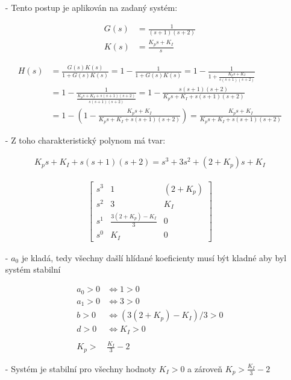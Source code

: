 \documentclass{article}
\newcommand\mat[1]{\begin{bmatrix}#1\end{bmatrix}}
\begin{document}
\begin{itemize}
    \item[-] Tento postup je aplikován na zadaný systém:

    \begin{align*}
        G(s) &= \frac{1}{(s+1)(s+2)}\\
        K(s) &= \frac{K_ps+K_I}{s}
    \end{align*}
    

    \begin{align*}
        H(s) &= \frac{G(s)K(s)}{1+G(s)K(s)} = 1-\frac{1}{1+G(s)K(s)}=
        1-\frac{1}{1+\frac{K_ps+K_I}{s(s+1)(s+2)}}\\
        &= 1-\frac{1}{\frac{K_ps+K_I+s(s+1)(s+2)}{s(s+1)(s+2)}}=
        1-\frac{s(s+1)(s+2)}{K_ps+K_I+s(s+1)(s+2)}\\
        &= 1-(1-\frac{K_ps+K_I}{K_ps+K_I+s(s+1)(s+2)})=\frac{K_ps+K_I}{K_ps+K_I+s(s+1)(s+2)}
    \end{align*}

    
    \item[-] Z toho charakteristický polynom má tvar:

    \begin{align*}
        K_ps+K_I+s(s+1)(s+2) = s^3+3s^2+(2+K_p)s+K_I
    \end{align*}

    \begin{align*}
        \mat{s^3 & 1 & (2+K_p)\\ 
             s^2 & 3 & K_I\\
             s^1 & \frac{3(2+K_p)-K_I}{3} & 0\\
             s^0 & K_I & 0}
    \end{align*}

    \item[-] $a_0$ je kladá, tedy všechny dašlí hlídané koeficienty musí být kladné aby byl systém stabilní
    
    \begin{align*}
        a_0>0 &\Longleftrightarrow 1>0\\
        a_1>0 &\Longleftrightarrow 3>0\\
        b>0 &\Longleftrightarrow (3(2+K_p)-K_I)/3>0\\
        d>0 &\Longleftrightarrow K_I>0\\
        \\
        K_p>&\frac{K_I}{3}-2
    \end{align*}

    \item[-] Systém je stabilní pro všechny hodnoty $K_I >0$ a zároveň $K_p > \frac{K_I}{3}-2 $ 


\end{itemize}
\end{document}

